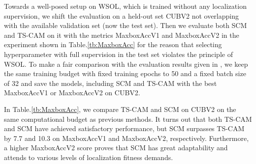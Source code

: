 \documentclass[runningheads]{llncs}
\begin{document}
 Towards a well-posed setup on WSOL, which is trained without any localization supervision, we shift the evaluation on a held-out set CUBV2 \cite{choe2020evaluating} not overlapping with the available validation set (now the test set). Then we evaluate both SCM and TS-CAM on it with the metrics MaxboxAccV1 and MaxboxAccV2 in the experiment shown in Table.\ref{tb:MaxboxAcc} for the reason that selecting hyperparameter  with full supervision in the test set violates the principle of WSOL. To make a fair comparison with the evaluation results given in \cite{choe2020evaluating}, we keep the same training budget with fixed training epochs to 50 and a fixed batch size of 32 and save the models, including SCM and TS-CAM with the best MaxboxAccV1 or MaxboxAccV2 on CUBV2.
 
 In Table.\ref{tb:MaxboxAcc}, we compare TS-CAM and SCM on CUBV2 \cite{choe2020evaluating} on the same computational budget as previous methods. It turns out that both TS-CAM and SCM have achieved satisfactory performance, but SCM surpasses TS-CAM by 7.7 and 10.3 on MaxboxAccV1 and MaxboxAccV2, respectively. Furthermore, a higher MaxboxAccV2 score proves that SCM has great adaptability and attends to various levels of localization fitness demands. 
 
\setlength{\tabcolsep}{16pt}
\end{document}
